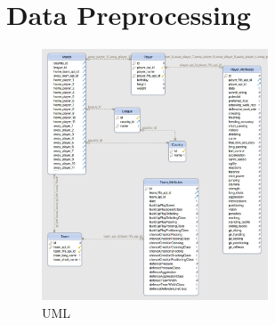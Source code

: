 
\chapter{Data Preprocessing}


\begin{figure}[h]
\centering
\includegraphics[width=0.6\textwidth]{images/erm.png}
\caption{UML}
\label{geo1}
\end{figure}